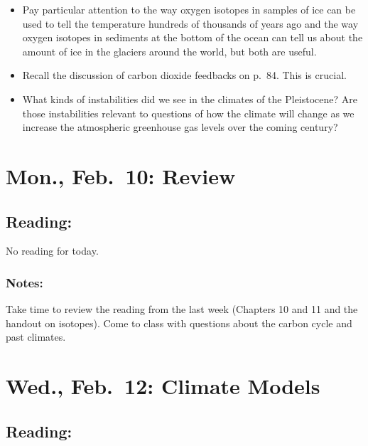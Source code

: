 \documentclass[
]{article}
\providecommand{\tightlist}{%
  \setlength{\itemsep}{0pt}\setlength{\parskip}{0pt}}
\begin{document}
\begin{itemize}
\tightlist
\item
  Pay particular attention to the way oxygen isotopes in samples of ice
  can be used to tell the temperature hundreds of thousands of years ago
  and the way oxygen isotopes in sediments at the bottom of the ocean
  can tell us about the amount of ice in the glaciers around the world,
  but both are useful.
\item
  Recall the discussion of carbon dioxide feedbacks on p.~84. This is
  crucial.
\item
  What kinds of instabilities did we see in the climates of the
  Pleistocene? Are those instabilities relevant to questions of how the
  climate will change as we increase the atmospheric greenhouse gas
  levels over the coming century?
\end{itemize}

\hypertarget{mon.-feb.-10-review}{%
\section{Mon., Feb.~10: Review}\label{mon.-feb.-10-review}}

\hypertarget{reading-14}{%
\subsection{Reading:}\label{reading-14}}

No reading for today.

\hypertarget{notes-1}{%
\subsubsection{Notes:}\label{notes-1}}

Take time to review the reading from the last week (Chapters 10 and 11
and the handout on isotopes). Come to class with questions about the
carbon cycle and past climates.

\hypertarget{wed.-feb.-12-climate-models}{%
\section{Wed., Feb.~12: Climate
Models}\label{wed.-feb.-12-climate-models}}

\hypertarget{reading-15}{%
\subsection{Reading:}\label{reading-15}}
\end{document}
